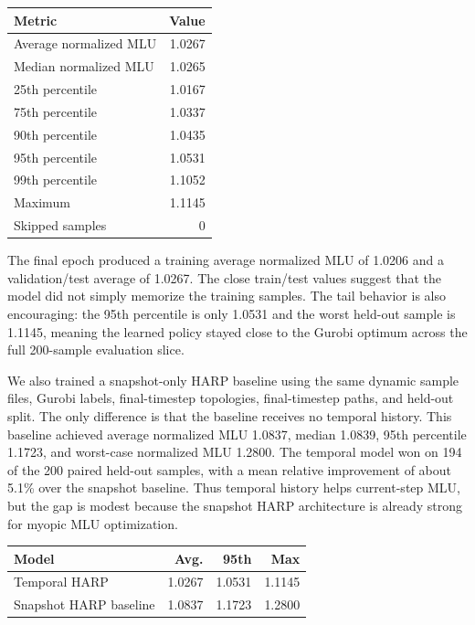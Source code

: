 \documentclass[letterpaper,twocolumn,10pt]{article}
\begin{document}
\begin{center}
\begin{tabular}{lr}
\hline
Metric & Value \\
\hline
Average normalized MLU & 1.0267 \\
Median normalized MLU & 1.0265 \\
25th percentile & 1.0167 \\
75th percentile & 1.0337 \\
90th percentile & 1.0435 \\
95th percentile & 1.0531 \\
99th percentile & 1.1052 \\
Maximum & 1.1145 \\
Skipped samples & 0 \\
\hline
\end{tabular}
\end{center}

The final epoch produced a training average normalized MLU of 1.0206 and a validation/test average of 1.0267. The close train/test values suggest that the model did not simply memorize the training samples. The tail behavior is also encouraging: the 95th percentile is only 1.0531 and the worst held-out sample is 1.1145, meaning the learned policy stayed close to the Gurobi optimum across the full 200-sample evaluation slice.

We also trained a snapshot-only HARP baseline using the same dynamic sample files, Gurobi labels, final-timestep topologies, final-timestep paths, and held-out split. The only difference is that the baseline receives no temporal history. This baseline achieved average normalized MLU 1.0837, median 1.0839, 95th percentile 1.1723, and worst-case normalized MLU 1.2800. The temporal model won on 194 of the 200 paired held-out samples, with a mean relative improvement of about 5.1\% over the snapshot baseline. Thus temporal history helps current-step MLU, but the gap is modest because the snapshot HARP architecture is already strong for myopic MLU optimization.

\begin{center}
\begin{tabular}{lrrr}
\hline
Model & Avg. & 95th & Max \\
\hline
Temporal HARP & 1.0267 & 1.0531 & 1.1145 \\
Snapshot HARP baseline & 1.0837 & 1.1723 & 1.2800 \\
\hline
\end{tabular}
\end{center}
\end{document}
